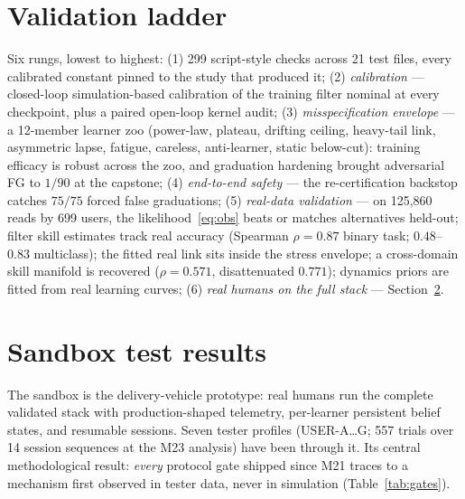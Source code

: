\documentclass[11pt]{article}
\begin{document}
\section{Validation ladder}
Six rungs, lowest to highest: (1) 299 script-style checks across 21 test files,
every calibrated constant pinned to the study that produced it; (2)
\emph{calibration} --- closed-loop simulation-based calibration of the training
filter nominal at every checkpoint, plus a paired open-loop kernel audit; (3)
\emph{misspecification envelope} --- a 12-member learner zoo (power-law,
plateau, drifting ceiling, heavy-tail link, asymmetric lapse, fatigue, careless,
anti-learner, static below-cut): training efficacy is robust across the zoo, and
graduation hardening brought adversarial FG to $1/90$ at the capstone; (4)
\emph{end-to-end safety} --- the re-certification backstop catches $75/75$
forced false graduations; (5) \emph{real-data validation} --- on 125{,}860 reads
by 699 users, the likelihood~\eqref{eq:obs} beats or matches alternatives
held-out; filter skill estimates track real accuracy (Spearman $\rho = 0.87$
binary task; $0.48$--$0.83$ multiclass); the fitted real link sits inside the
stress envelope; a cross-domain skill manifold is recovered ($\rho = 0.571$,
disattenuated $0.771$); dynamics priors are fitted from real learning curves;
(6) \emph{real humans on the full stack} --- Section~\ref{sec:sandbox}.

\section{Sandbox test results}
\label{sec:sandbox}
The sandbox is the delivery-vehicle prototype: real humans run the complete
validated stack with production-shaped telemetry, per-learner persistent belief
states, and resumable sessions. Seven tester profiles (USER-A\ldots G; 557
trials over 14 session sequences at the M23 analysis) have been through it. Its
central methodological result: \emph{every} protocol gate shipped since M21
traces to a mechanism first observed in tester data, never in simulation
(Table~\ref{tab:gates}).
\end{document}
